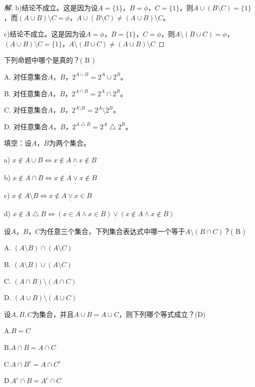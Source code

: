 \documentclass{article}
\begin{document}
\begin{CJK}{UTF8}{gbsn}
\begin{proof}[解]
  b)结论不成立。这是因为设$A=\{1\}$，$B=\phi$，$C=\{1\}$，则$A\cup(B\setminus C)=\{1\}$，而$(A\cup B)\setminus C=\phi$，$A\cup(B\setminus C) \neq (A\cup B)\setminus C$。

  c)结论不成立。这是因为设$A=\phi$，$B=\{1\}$，$C=\phi$，则$A\setminus (B\cup C)=\phi$，$(A\cup B)\setminus C=\{1\}$，$A\setminus (B\cup C) \neq (A\cup B)\setminus C$
\end{proof}
\begin{Exercise}
  下列命题中哪个是真的？(  B  )

A. 对任意集合$A$，$B$，$2^{A\cup B} = 2^A \cup 2^B$。

B. 对任意集合$A$，$B$，$2^{A\cap B} = 2^A \cap 2^B$。

C. 对任意集合$A$，$B$，$2^{A\setminus B} = 2^A \setminus 2^B$。

D. 对任意集合$A$，$B$，$2^{A\bigtriangleup B} = 2^A \bigtriangleup 2^B$。

\end{Exercise}
\begin{Exercise}
  填空：设$A$，$B$为两个集合。

  a) $x\notin A\cup B\Leftrightarrow \underline{x\notin A \land x\notin B}$

  b) $x\notin A\cap B\Leftrightarrow \underline{x\notin A \lor x\notin B}$

  c) $x\notin A\setminus B\Leftrightarrow \underline{x\notin A \lor x\in B}$

  d) $x\notin A\bigtriangleup B\Leftrightarrow \underline{(x\in A \land x\in B)\lor(x\notin A \land x\notin B)}$
\end{Exercise}
\begin{Exercise}
  设$A$，$B$，$C$为任意三个集合，下列集合表达式中哪一个等于$A\setminus (B\cap C)$？( B  )

  A. $(A\setminus B)\cap (A\setminus C)$

  B. $(A\setminus B)\cup (A\setminus C)$

  C. $(A\cap B)\setminus (A\cap C)$

  D. $(A\cup B)\setminus (A\cup C)$
\end{Exercise}


\begin{Exercise}
  设$A,B,C$为集合，并且$A\cup B=A\cup C$，则下列哪个等式成立？(D)

  A.$B=C$

  B.$A\cap B = A\cap C$

  C.$A\cap B^c = A\cap C^c$

  D.$A^c\cap B = A^c\cap C$
\end{Exercise}




\end{CJK}
\end{document}
